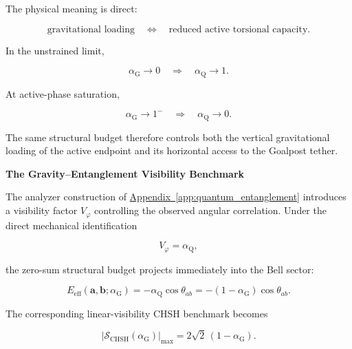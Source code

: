 The physical meaning is direct:

\[
\text{gravitational loading}
\quad\Longleftrightarrow\quad
\text{reduced active torsional capacity}.
\]

In the unstrained limit,

\begin{equation}
    \alpha_{\mathrm G}\rightarrow0
    \quad\Longrightarrow\quad
    \alpha_{\mathrm Q}\rightarrow1.
\end{equation}

At active-phase saturation,

\begin{equation}
    \alpha_{\mathrm G}\rightarrow1^{-}
    \quad\Longrightarrow\quad
    \alpha_{\mathrm Q}\rightarrow0.
\end{equation}

The same structural budget therefore controls both the vertical gravitational loading of the active endpoint and its horizontal access to the Goalpost tether.

\vspace{0.5em}
\noindent\textbf{The Gravity--Entanglement Visibility Benchmark}

\noindent The analyzer construction of
\hyperref[app:quantum_entanglement]{Appendix~\ref*{app:quantum_entanglement}}
introduces a visibility factor $V_{\varphi}$ controlling the observed angular correlation. Under the direct mechanical identification

\begin{equation}
    V_{\varphi}
    =
    \alpha_{\mathrm Q},
\end{equation}

the zero-sum structural budget projects immediately into the Bell sector:

\begin{equation}
    E_{\mathrm{eff}}
    (\mathbf a,\mathbf b;\alpha_{\mathrm G})
    =
    -\alpha_{\mathrm Q}
    \cos\theta_{ab}
    =
    -(1-\alpha_{\mathrm G})
    \cos\theta_{ab}.
    \label{eq:grav_modulated_bell}
\end{equation}

The corresponding linear-visibility CHSH benchmark becomes

\begin{equation}
    \left|
        \mathcal S_{\mathrm{CHSH}}
        (\alpha_{\mathrm G})
    \right|_{\max}
    =
    2\sqrt{2}\,
    (1-\alpha_{\mathrm G}).
    \label{eq:grav_modulated_chsh}
\end{equation}

